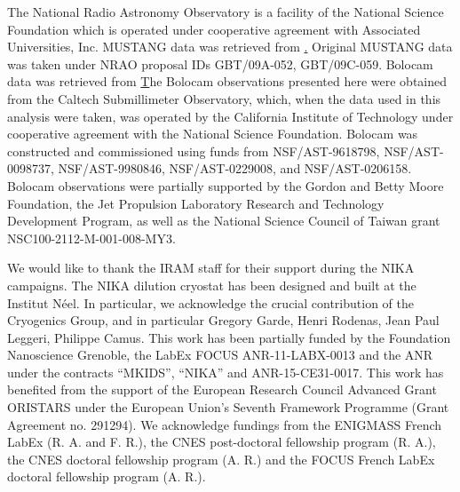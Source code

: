 \documentclass[twocolumn,traditabstract]{aa}
\begin{document}
The National Radio Astronomy Observatory is a facility of the National Science Foundation which is operated
under cooperative agreement with Associated Universities, Inc. MUSTANG data was retrieved from
\href{https://safe.nrao.edu/wiki/bin/view/GB/Pennarray/MUSTANG_CLASH}. Original MUSTANG data was
taken under NRAO proposal IDs GBT/09A-052, GBT/09C-059. Bolocam data was retrieved from
\href{http://irsa.ipac.caltech.edu/data/Planck/release\_2/ancillary-data/bolocam/}
The Bolocam observations presented here were obtained from the Caltech Submillimeter Observatory, which,
when the data used in this analysis were taken, was operated by the California Institute of Technology under
cooperative agreement with the National Science Foundation. Bolocam was constructed and commissioned using funds
from NSF/AST-9618798, NSF/AST-0098737, NSF/AST-9980846, NSF/AST-0229008, and NSF/AST-0206158. Bolocam observations
were partially supported by the Gordon and Betty Moore Foundation, the Jet Propulsion Laboratory Research and
Technology Development Program, as well as the National Science Council of Taiwan grant NSC100-2112-M-001-008-MY3.

We would like to thank the IRAM staff for their support during the NIKA campaigns. 
The NIKA dilution cryostat has been designed and built at the Institut N\'eel. 
In particular, we acknowledge the crucial contribution of the Cryogenics Group, and 
in particular Gregory Garde, Henri Rodenas, Jean Paul Leggeri, Philippe Camus. 
This work has been partially funded by the Foundation Nanoscience Grenoble, the LabEx FOCUS ANR-11-LABX-0013 and 
the ANR under the contracts ``MKIDS'', ``NIKA'' and ANR-15-CE31-0017. 
This work has benefited from the support of the European Research Council Advanced Grant ORISTARS 
under the European Union's Seventh Framework Programme (Grant Agreement no. 291294).
We acknowledge fundings from the ENIGMASS French LabEx (R. A. and F. R.), 
the CNES post-doctoral fellowship program (R. A.),  the CNES doctoral fellowship program (A. R.) and 
the FOCUS French LabEx doctoral fellowship program (A. R.).



\appendix

\end{document}

